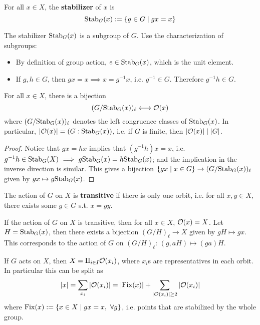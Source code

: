 \documentclass{article}
\begin{document}
\begin{definition}[Stabilizer]
    For all $x \in X$, the \textbf{stabilizer} of $x$ is
    \[
        \mathrm{Stab}_G(x) := \{g \in G \mid gx = x\}
    \]
\end{definition}

\begin{remark}
    The stabilizer $\mathrm{Stab}_G(x)$ is a subgroup of $G$. Use the characterization of subgroups:
    \begin{itemize}
        \item By definition of group action, $e \in \mathrm{Stab}_G(x)$, which is the unit element.
        \item If $g, h \in G$, then $gx = x \implies x = g^{-1}x$, i.e. $g^{-1} \in G$. Therefore $g^{-1}h \in G$. 
    \end{itemize}
\end{remark}

\begin{lemma}
    For all $x \in X$, there is a bijection
    \[
        (G / \mathrm{Stab}_G(x))_{\ell} \longleftrightarrow \mathcal{O}(x)
    \]
    where $(G / \mathrm{Stab}_G(x))_{\ell}$ denotes the left congruence classes of $\mathrm{Stab}_G(x)$. In particular, $\left|\mathcal{O}(x)\right| = (G : \mathrm{Stab}_G(x))$, i.e. if $G$ is finite, then $\left|\mathcal{O}(x)\right| \mid \left|G\right|$.
\end{lemma}

\begin{proof}
    Notice that $gx = hx$ implies that $(g^{-1}h)x = x$, i.e. $g^{-1}h \in \mathrm{Stab}_G(X) \ \Longrightarrow\  g \mathrm{Stab}_G(x) = h \mathrm{Stab}_G(x)$; and the implication in the inverse direction is similar. This gives a bijection $\{ gx \mid x \in G \} \to (G / \mathrm{Stab}_G(x))_{\ell}$ given by $gx \mapsto g \mathrm{Stab}_G(x)$.
\end{proof}

\begin{definition}[Transitive]
    The action of $G$ on $X$ is \textbf{transitive} if there is only one orbit, i.e. for all $x, y \in X$, there exists some $g \in G$ s.t. $x = gy$.
\end{definition}

\begin{corollary}
    If the action of $G$ on $X$ is transitive, then for all $x \in X$, $\mathcal{O}(x) = X$. Let $H = \mathrm{Stab}_G(x)$, then there exists a bijection $(G/H)_{\ell} \to X$ given by $gH \mapsto gx$. This corresponds to the action of $G$ on $(G/H)_{\ell}$: $(g, aH) \mapsto (ga)H$.
\end{corollary}

\begin{remark}
    If $G$ acts on $X$, then $X = \amalg_{i \in I} \mathcal{O}(x_i)$, where $x_i$s are representatives in each orbit. In particular this can be split as
    \[
        \left|x\right| = \sum_{x_i} \left|\mathcal{O}(x_i)\right| = \left|\mathrm{Fix}(x)\right| + \sum_{\left|\mathcal{O}(x_i)\right| \geq 2} \left|\mathcal{O}(x_i)\right|
    \]
    where $\mathrm{Fix}(x) := \{ x \in X \mid gx = x,\ \forall g \}$, i.e. points that are stabilized by the whole group.
\end{remark}
\end{document}
